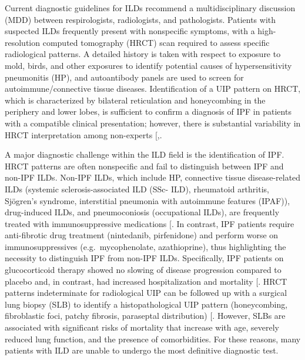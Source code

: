 \documentclass[
]{article}
\begin{document}
Current diagnostic guidelines for ILDs recommend a multidisciplinary discussion (MDD) between respirologists, radiologists, and pathologists. Patients with suspected ILDs frequently present with nonspecific symptoms, with a high-resolution computed tomography (HRCT) scan required to assess specific radiological patterns. A detailed history is taken with respect to exposure to mold, birds, and other exposures to identify potential causes of hypersensitivity pneumonitis (HP), and autoantibody panels are used to screen for autoimmune/connective tissue diseases. Identification of a UIP pattern on HRCT, which is characterized by bilateral reticulation and honeycombing in the periphery and lower lobes, is sufficient to confirm a diagnosis of IPF in patients with a compatible clinical presentation; however, there is substantial variability in HRCT interpretation among non-experts {[},\citeproc{ref-lederer_idiopathic_2018}{13}{]}.

A major diagnostic challenge within the ILD field is the identification of IPF. HRCT patterns are often nonspecific and fail to distinguish between IPF and non-IPF ILDs. Non-IPF ILDs, which include HP, connective tissue disease-related ILDs (systemic sclerosis-associated ILD (SSc- ILD), rheumatoid arthritis, Sjögren's syndrome, interstitial pneumonia with autoimmune features (IPAF)), drug-induced ILDs, and pneumoconiosis (occupational ILDs), are frequently treated with immunosuppressive medications {[}\citeproc{ref-lederer_idiopathic_2018}{13}{]}. In contrast, IPF patients require anti-fibrotic drug treatment (nintedanib, pirfenidone) and perform worse on immunosuppressives (e.g.~mycophenolate, azathioprine), thus highlighting the necessity to distinguish IPF from non-IPF ILDs. Specifically, IPF patients on glucocorticoid therapy showed no slowing of disease progression compared to placebo and, in contrast, had increased hospitalization and mortality {[}\citeproc{ref-idiopathic_pulmonary_fibrosis_clinical_research_network_prednisone_2012}{14}{]}. HRCT patterns indeterminate for radiological UIP can be followed up with a surgical lung biopsy (SLB) to identify a histopathological UIP pattern (honeycombing, fibroblastic foci, patchy fibrosis, paraseptal distribution) {[}\citeproc{ref-lynch_diagnostic_2018}{15}{]}. However, SLBs are associated with significant risks of mortality that increase with age, severely reduced lung function, and the presence of comorbidities. For these reasons, many patients with ILD are unable to undergo the most definitive diagnostic test.
\end{document}
